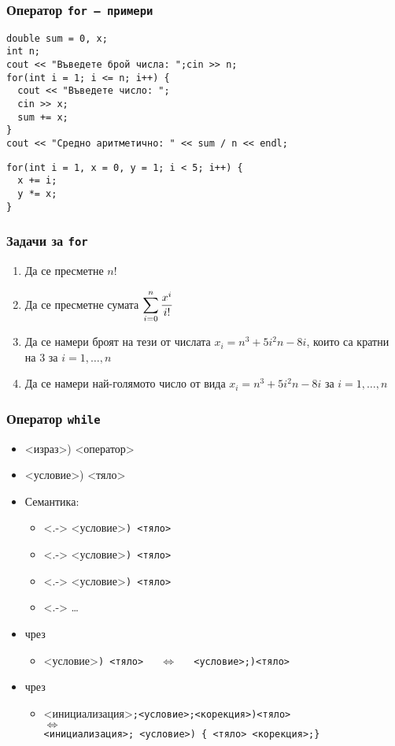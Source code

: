 \documentclass{beamer}
\newcommand{\expsum}{\displaystyle \sum_{i=0}^n \limits \frac{x^i}{i!}}
\begin{document}
\begin{frame}
  \frametitle{Оператор \tt{for} --- примери}

\begin{lstlisting}
double sum = 0, x;
int n;
cout << "Въведете брой числа: ";cin >> n;
for(int i = 1; i <= n; i++) {
  cout << "Въведете число: ";
  cin >> x;
  sum += x;
}
cout << "Средно аритметично: " << sum / n << endl;
\end{lstlisting}
\pause
\begin{lstlisting}
for(int i = 1, x = 0, y = 1; i < 5; i++) {
  x += i;
  y *= x;
}
\end{lstlisting}
\end{frame}

\begin{frame}
  \frametitle{Задачи за \tt{for}}

  \begin{enumerate}[<+->]
  \item Да се пресметне $n!$
  \item Да се пресметне сумата $\expsum$
  \item Да се намери броят на тези от числата $x_i = n^3 + 5i^2n -8i$, които са кратни на 3 за $i=1,\ldots,n$
  \item Да се намери най-голямото число от вида $x_i = n^3 + 5i^2n -8i$ за $i=1,\ldots,n$
  \end{enumerate}
\end{frame}

\begin{frame}
  \frametitle{Оператор \tt{while}}

  \begin{itemize}[<+->]
  \item {}<израз>\tta) <оператор>
  \item {}<условие>\tta) <тяло>
  \item Семантика:
    \begin{itemize}
    \item<.-> <условие>\tt) <тяло>
    \item<.-> <условие>\tt) <тяло>
    \item<.-> <условие>\tt) <тяло>
    \item<.-> \ldots
    \end{itemize}
  \item {} чрез 
    \begin{itemize}
    \item {}<условие>\tt) <тяло> $\quad\Leftrightarrow\quad$
      <условие>\tt{;)}<тяло>
    \end{itemize}
  \item {} чрез 
    \begin{itemize}
    \item {}<инициализация>\tt;<условие>\tt;<корекция>\tt)<тяло>\\
      $\Leftrightarrow$\\
      <инициализация>\tt; <условие>\tt{) \{ }<тяло> <корекция>\tt{;\}}
    \end{itemize}
  \end{itemize}
\end{frame}
\end{document}
